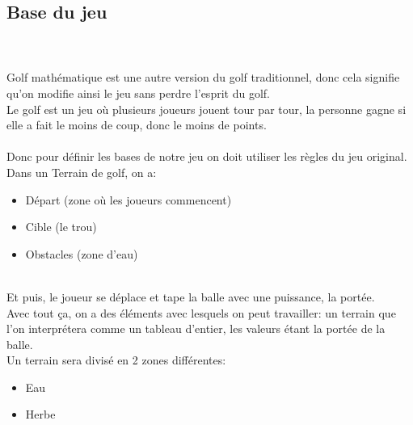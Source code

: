\documentclass{article}
\begin{document}
\subsection{Base du jeu}
~\\~\\
Golf mathématique est une autre version du golf traditionnel, donc cela signifie qu'on modifie ainsi le jeu sans perdre l'esprit du golf.\\
Le golf est un jeu où plusieurs joueurs jouent tour par tour, la personne gagne si elle a fait le moins de coup, donc le moins de points.\\~\\
Donc pour définir les bases de notre jeu on doit utiliser les règles du jeu original.
Dans un Terrain de golf, on a:
\begin{itemize}
\item Départ (zone où les joueurs commencent)
\item Cible (le trou)
\item Obstacles (zone d'eau)
\end{itemize}
~\\
Et puis, le joueur se déplace et tape la balle avec une puissance, la portée.\\
Avec tout ça, on a des éléments avec lesquels on peut travailler: un terrain que l'on interprétera comme un tableau d'entier, les valeurs étant la portée de la balle.\\
Un terrain sera divisé en 2 zones différentes:
\begin{itemize}
\item Eau
\item Herbe
\end{itemize}
\newpage
\end{document}
